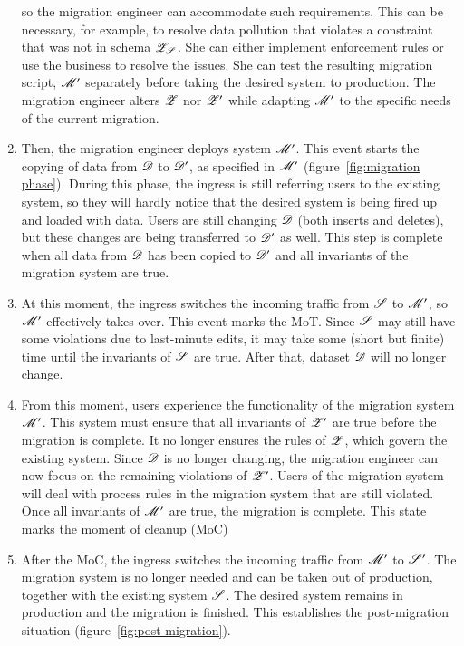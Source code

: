 \documentclass{elsarticle}
\begin{document}
\begin{enumerate}
         so the migration engineer can accommodate such requirements.
         This can be necessary, for example, to resolve data pollution that violates a constraint that was not in schema $\mathscr{Z}_{\mathscr{S}}$.
         She can either implement enforcement rules or use the business to resolve the issues.
         She can test the resulting migration script, $\mathscr{M}'$ separately before taking the desired system to production.
         The migration engineer alters $\mathscr{Z}$ nor $\mathscr{Z}'$ while adapting $\mathscr{M}'$ to the specific needs of the current migration.
   \item Then, the migration engineer deploys system $\mathscr{M}'$.
         This event starts the copying of data from $\mathscr{D}$ to $\mathscr{D}'$, as specified in $\mathscr{M}'$ (figure~\ref{fig:migration phase}).
         During this phase, the ingress is still referring users to the existing system,
         so they will hardly notice that the desired system is being fired up and loaded with data.
         Users are still changing $\mathscr{D}$ (both inserts and deletes),
         but these changes are being transferred to $\mathscr{D}'$ as well.
         This step is complete when all data from $\mathscr{D}$ has been copied to $\mathscr{D}'$ and all invariants of the migration system are true.
   \item At this moment, the ingress switches the incoming traffic from $\mathscr{S}$ to $\mathscr{M}'$,
         so $\mathscr{M}'$ effectively takes over.
         This event marks the MoT.
         Since $\mathscr{S}$ may still have some violations due to last-minute edits,
         it may take some (short but finite) time until the invariants of $\mathscr{S}$ are true.
         After that, dataset $\mathscr{D}$ will no longer change.
   \item From this moment, users experience the functionality of the migration system $\mathscr{M}'$.
         This system must ensure that all invariants of $\mathscr{Z}'$ are true before the migration is complete.
         It no longer ensures the rules of $\mathscr{Z}$, which govern the existing system.
         Since $\mathscr{D}$ is no longer changing, the migration engineer can now focus on the remaining violations of $\mathscr{Z}'$.
         Users of the migration system will deal with process rules in the migration system that are still violated.
         Once all invariants of $\mathscr{M}'$ are true, the migration is complete.
         This state marks the moment of cleanup (MoC)
   \item After the MoC, the ingress switches the incoming traffic from $\mathscr{M}'$ to $\mathscr{S}'$.
         The migration system is no longer needed and can be taken out of production, together with the existing system $\mathscr{S}$.
         The desired system remains in production and the migration is finished.
         This establishes the post-migration situation (figure~\ref{fig:post-migration}).
\end{enumerate}
\end{document}
